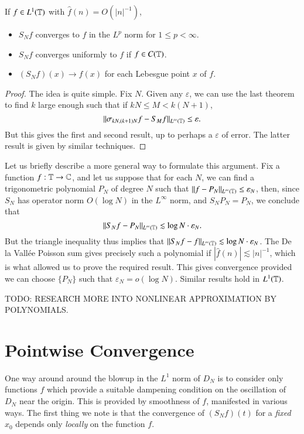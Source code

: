 \begin{corollary}
    If $f \in L^1(\operatorname{\mathbb{T}})$ with $\widehat{f}(n) = O(|n|^{-1})$,
    \begin{itemize}
        \item $S_Nf$ converges to $f$ in the $L^p$ norm for $1 \leq p < \infty$.
        \item $S_Nf$ converges uniformly to $f$ if $f \in C(\operatorname{\mathbb{T}})$.
        \item $(S_N f)(x) \to f(x)$ for each Lebesgue point $x$ of $f$.
    \end{itemize}
\end{corollary}
\begin{proof}
    The idea is quite simple. Fix $N$. Given any $\varepsilon$, we can use the last theorem to find $k$ large enough such that if $kN \leq M < k(N+1)$,
    \[ \| \sigma_{kN,(k+1)N} f - S_M f \|_{L^\infty(\operatorname{\mathbb{T}})} \leq \varepsilon. \]
    But this gives the first and second result, up to perhaps a $\varepsilon$ of error. The latter result is given by similar techniques.
\end{proof}

Let us briefly describe a more general way to formulate this argument. Fix a function $f: \operatorname{\mathbb{T}} \to \operatorname{\mathbb{C}}$, and let us suppose that for each $N$, we can find a trigonometric polynomial $P_N$ of degree $N$ such that $\| f - P_N \|_{L^\infty(\operatorname{\mathbb{T}})} \leq \varepsilon_N$, then, since $S_N$ has operator norm $O(\log N)$ in the $L^\infty$ norm, and $S_N P_N = P_N$, we conclude that
%
\[ \| S_N f - P_N \|_{L^\infty(\operatorname{\mathbb{T}})} \lesssim \log N \cdot \varepsilon_N. \]
%
But the triangle inequality thus implies that $\| S_N f - f \|_{L^\infty(\operatorname{\mathbb{T}})} \lesssim \log N \cdot \varepsilon_N$. The De la Vall\'{e}e Poisson sum gives precisely such a polynomial if $|\widehat{f}(n)| \lesssim |n|^{-1}$, which is what allowed us to prove the required result. This gives convergence provided we can choose $\{ P_N \}$ such that $\varepsilon_N = o(\log N)$. Similar results hold in $L^1(\operatorname{\mathbb{T}})$.

TODO: RESEARCH MORE INTO NONLINEAR APPROXIMATION BY POLYNOMIALS.

\section{Pointwise Convergence}

One way around around the blowup in the $L^1$ norm of $D_N$ is to consider only functions $f$ which provide a suitable dampening condition on the oscillation of $D_N$ near the origin. This is provided by smoothness of $f$, manifested in various ways. The first thing we note is that the convergence of $(S_N f)(t)$ for a \emph{fixed} $x_0$ depends only \emph{locally} on the function $f$.

